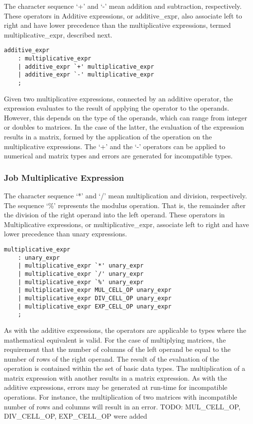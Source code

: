 \documentclass[prodmode,acmtecs]{acmsmall}
\begin{document}
The character sequence `+' and `-' mean addition and subtraction, 
respectively. These operators in Additive expressions, or additive\_expr, 
also associate left to right and have lower precedence than the 
multiplicative expressions, termed multiplicative\_expr, described next.

\begin{lstlisting}
additive_expr
	: multiplicative_expr
	| additive_expr `+' multiplicative_expr
	| additive_expr `-' multiplicative_expr
	;
\end{lstlisting}

Given two multiplicative expressions, connected by an additive operator, 
the expression evaluates to the result of applying the operator to the
operands. However, this depends on the type of the operands, which can
range from integer or doubles to matrices. In the case of the latter,
the evaluation of the expression results in a matrix, formed by the 
application of the operation on the multiplicative expressions.
The `+' and the `-' operators can be applied to numerical and matrix types 
and errors are generated for incompatible types.
\medskip

\subsubsection{Job Multiplicative Expression}

The character sequence `*' and `/' mean multiplication and division, 
respectively. The sequence `\%' represents the modulus operation. That
is, the remainder after the division of the right operand into the left
operand. These operators in Multiplicative expressions, or 
multiplicative\_expr, associate left to right and have lower precedence 
than unary expressions.

\begin{lstlisting}
multiplicative_expr
	: unary_expr
	| multiplicative_expr `*' unary_expr
	| multiplicative_expr `/' unary_expr
	| multiplicative_expr `%' unary_expr
	| multiplicative_expr MUL_CELL_OP unary_expr
	| multiplicative_expr DIV_CELL_OP unary_expr
	| multiplicative_expr EXP_CELL_OP unary_expr
	;
\end{lstlisting}

As with the additive expressions, the operators are applicable to types
where the mathematical equivalent is valid. For the case of multiplying
matrices, the requirement that the number of columns of the left operand 
be equal to the number of rows of the right operand. The result of the
evaluation of the operation is contained within the set of basic data 
types. The multiplication of a matrix expression with another results in 
a matrix expression. As with the additive expressions, errors may be 
generated at run-time for incompatible operations. For instance, the
multiplication of two matrices with incompatible number of rows and
columns will result in an error.
TODO: MUL\_CELL\_OP, DIV\_CELL\_OP, EXP\_CELL\_OP were added
\medskip
\end{document}
